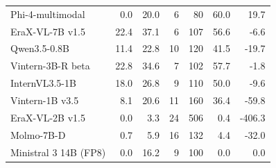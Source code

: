 \begin{table}[t]
\begin{tabular}{lrrrrrr}
Phi-4-multimodal & 0.0 & 20.0 & 6 & 80 & 60.0 & 19.7 \\
EraX-VL-7B v1.5 & 22.4 & 37.1 & 6 & 107 & 56.6 & -6.6 \\
Qwen3.5-0.8B & 11.4 & 22.8 & 10 & 120 & 41.5 & -19.7 \\
Vintern-3B-R beta & 22.8 & 34.6 & 7 & 102 & 57.7 & -1.8 \\
InternVL3.5-1B & 18.0 & 26.8 & 9 & 110 & 50.0 & -9.6 \\
Vintern-1B v3.5 & 8.1 & 20.6 & 11 & 160 & 36.4 & -59.8 \\
EraX-VL-2B v1.5 & 0.0 & 3.3 & 24 & 506 & 0.4 & -406.3 \\
Molmo-7B-D & 0.7 & 5.9 & 16 & 132 & 4.4 & -32.0 \\
Ministral 3 14B (FP8) & 0.0 & 16.2 & 9 & 100 & 0.0 & 0.0 \\
\bottomrule
\end{tabular}
\par{}
\end{table}
